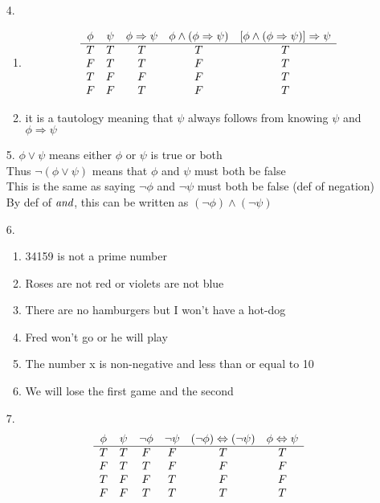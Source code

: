 \documentclass[11pt]{exam}
\begin{document}
\begin{enumerate}[leftmargin=0pt]
\item[4.]
\begin{enumerate}[label=(\alph*)]
    \item \begin{displaymath}
    \begin{array}{c c c c c}
        \phi & \psi & \phi \Rightarrow \psi & \phi \land (\phi \Rightarrow \psi) & [\phi \land (\phi \Rightarrow \psi)] \Rightarrow \psi \\
        \hline
        T & T & T & T & T\\
        F & T & T & F & T\\
        T & F & F & F & T\\
        F & F & T & F & T
    \end{array}
\end{displaymath}
    \item it is a tautology meaning that $\psi$ always follows from knowing $\psi$ and $\phi \Rightarrow \psi$
\end{enumerate}

\item[5.]
$\phi \lor \psi$ means either $\phi$ or $\psi$ is true or both \\
Thus $\neg (\phi \lor \psi)$ means that $\phi$ and $\psi$ must both be false \\
This is the same as saying $\neg \phi$ and $\neg \psi$ must both be false (def of negation)\\
By def of $\emph{and}$, this can be written as $(\neg \phi) \land (\neg \psi)$

\item[6.]
\begin{enumerate}[label=(\alph*)]
    \item 34159 is not a prime number
    \item Roses are not red or violets are not blue
    \item There are no hamburgers but I won't have a hot-dog
    \item Fred won't go or he will play
    \item The number x is non-negative and less than or equal to 10
    \item We will lose the first game and the second
\end{enumerate}

\item[7.]
\begin{displaymath}
    \begin{array}{c c c c c c}
         \phi & \psi & \neg \phi & \neg \psi & (\neg \phi) \Leftrightarrow (\neg \psi) & \phi \Leftrightarrow \psi \\
         \hline 
         T & T & F & F & T & T \\
         F & T & T & F & F & F \\
         T & F & F & T & F & F \\
         F & F & T & T & T & T
    \end{array}
\end{displaymath}


\end{enumerate}
\end{document}
